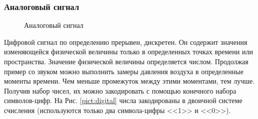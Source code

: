 \begin{frame}
\frametitle{Аналоговый сигнал}
\begin{figure}
    \begin{center}
    \end{center}
    \caption{Аналоговый сигнал}\label{pict:analog}
\end{figure} 
\end{frame}


Цифровой сигнал по определению прерывен, дискретен. Он содержит значения изменяющейся физической величины только в определенных точках времени или пространства. Значение физической величины определяется числом. Продолжая пример со звуком можно выполнить замеры давления воздуха в определенные моменты времени. Чем меньше промежуток между этими моментами, тем лучше. Получив набор чисел, их можно закодировать с помощью конечного набора символов-цифр. На Рис. \ref{pict:digital} числа закодированы в двоичной системе счисления (используются только два символа-цифры <<1>> и <<0>>).


